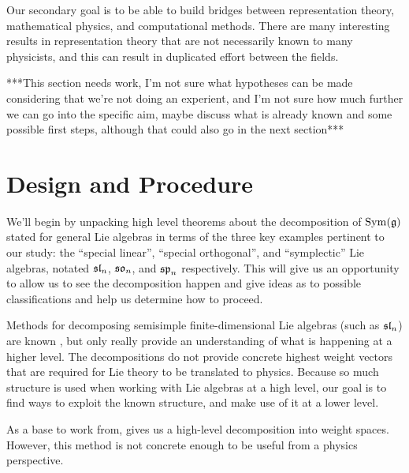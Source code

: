 \documentclass[11pt, reqno]{amsart}
\begin{document}
Our secondary goal is to be able to build bridges between representation theory, mathematical physics, and computational methods. There are many interesting results in representation theory that are not necessarily known to many physicists, and this can result in duplicated effort between the fields.







***This section needs work, I'm not sure what hypotheses can be made considering that we're not doing an experient, and I'm not sure how much further we can go into the specific aim, maybe discuss what is already known and some possible first steps, although that could also go in the next section***

\section{Design and Procedure}




We'll begin by unpacking high level theorems about the decomposition of $\operatorname{Sym}(\mathfrak{g})$ stated for general Lie algebras in terms of the three key examples pertinent to our study: the ``special linear'', ``special orthogonal'', and ``symplectic'' Lie algebras, notated $\mathfrak{sl}_n$, $\mathfrak{so}_n$, and $\mathfrak{sp}_n$ respectively. This will give us an opportunity to allow us to see the decomposition happen and give ideas as to possible classifications and help us determine how to proceed.


Methods for decomposing semisimple finite-dimensional Lie algebras (such as $\mathfrak{sl}_n$) are known \cite{Dau14}, but only really provide an understanding of what is happening at a higher level. The decompositions do not provide concrete highest weight vectors that are required for Lie theory to be translated to physics. Because so much structure is used when working with Lie algebras at a high level, our goal is to find ways to exploit the known structure, and make use of it at a lower level.

As a base to work from, \cite{Dau14} gives us a high-level decomposition into weight spaces. However, this method is not concrete enough to be useful from a physics perspective.
\end{document}
